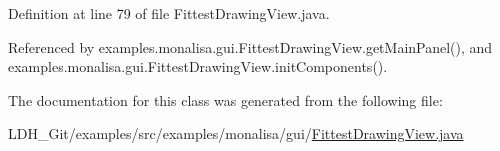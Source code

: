 Definition at line 79 of file Fittest\-Drawing\-View.\-java.



Referenced by examples.\-monalisa.\-gui.\-Fittest\-Drawing\-View.\-get\-Main\-Panel(), and examples.\-monalisa.\-gui.\-Fittest\-Drawing\-View.\-init\-Components().



The documentation for this class was generated from the following file\-:\begin{DoxyCompactItemize}
\item 
L\-D\-H\-\_\-\-Git/examples/src/examples/monalisa/gui/\hyperlink{monalisa_2gui_2_fittest_drawing_view_8java}{Fittest\-Drawing\-View.\-java}\end{DoxyCompactItemize}
